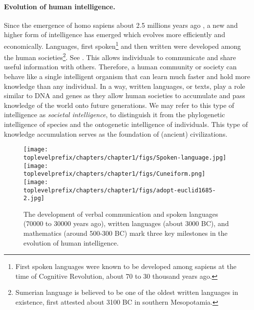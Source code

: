 \documentclass[../../book-main.tex]{subfiles}
\begin{document}
\paragraph{Evolution of human intelligence.}
Since the emergence of homo sapiens about 2.5 millions years ago \cite{Harari-2015}, a new and higher form of intelligence has emerged which evolves more efficiently and economically. Languages, first spoken\footnote{First spoken languages were known to be developed among sapiens at the time of Cognitive Revolution, about 70 to 30 thousand years ago.} and then written  were developed among the human societies\footnote{Sumerian language is believed to be one of the oldest written languages in existence, first attested about 3100 BC in southern Mesopotamia.}. See . This allows individuals to communicate and share useful information with others. Therefore, a human community or society can behave like a single intelligent organism that can learn much faster and hold more knowledge than any individual. In a way, written languages, or texts, play a role similar to DNA and genes as they allow human societies to accumulate and pass knowledge of the world onto future generations. We may refer to this type of intelligence as {\em  societal intelligence}, to distinguish it from the phylogenetic intelligence of species and the ontogenetic intelligence of individuals. This type of knowledge accumulation serves as the foundation of (ancient) civilizations.
\begin{figure}
    \centering
    \texttt{[image: \\toplevelprefix/chapters/chapter1/figs/Spoken-language.jpg]}
   \hspace{5mm} \texttt{[image: \\toplevelprefix/chapters/chapter1/figs/Cuneiform.png]}
   \hspace{5mm} \texttt{[image: \\toplevelprefix/chapters/chapter1/figs/adopt-euclid1685-2.jpg]}
    \caption{The development of verbal communication and spoken languages (70000 to 30000 years ago), written languages (about 3000 BC), and mathematics (around 500-300 BC) mark three key milestones in the evolution of human intelligence.}
    \label{fig:human-intelligence}
\end{figure}
\end{document}
